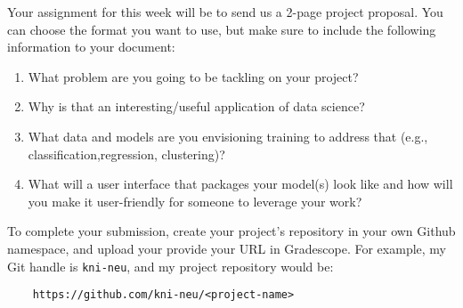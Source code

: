 \documentclass[paper=a4, fontsize=11pt]{scrartcl} %
\author{
    \textbf{YOUR NAME} \\ 
    \textbf{YOUR GIT USERNAME} \\ 
    \textbf{YOUR E-MAIL}
}%
\begin{document}
\maketitle %


Your assignment for this week will be to send us a 2-page project proposal. You can choose the format you want to use, but make sure to include the following information to your document:


\begin{enumerate}
    \item What problem are you going to be tackling on your project?
    \item Why is that an interesting/useful application of data science?
    \item What data and models are you envisioning training to address that (e.g., classification,regression, clustering)?
    \item What will a user interface that packages your model(s) look like and how will you make it user-friendly for someone to leverage your work?
\end{enumerate}

To complete your submission, create your project's repository in your own Github namespace, and upload your provide your URL in Gradescope. For example, my Git handle is \verb"kni-neu", and my project repository would be:

\begin{verbatim}
    https://github.com/kni-neu/<project-name>
\end{verbatim}
\end{document}
